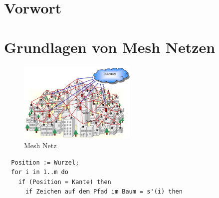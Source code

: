 \section{Vorwort}

\section{Grundlagen von Mesh Netzen}

\begin{figure} [htbp]
	\centering
		\includegraphics[width=0.50\textwidth]{WMN}
	\caption{Mesh Netz}
	\label{fig:WMN}
\end{figure}


\begin{verbatim}
  Position := Wurzel;  
  for i in 1..m do
    if (Position = Kante) then	
      if Zeichen auf dem Pfad im Baum = s'(i) then   
\end{verbatim}